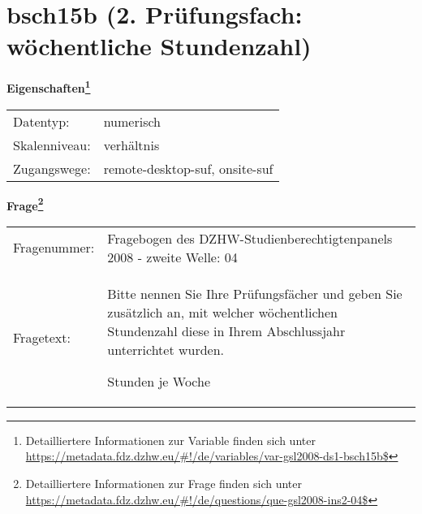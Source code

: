 
    \setcounter{footnote}{0}

    \vspace*{-1.8cm}
	\section{bsch15b (2. Prüfungsfach: wöchentliche Stundenzahl)}
	\label{section:bsch15b}



    \vspace*{0.5cm}
    \noindent\textbf{Eigenschaften\footnote{Detailliertere Informationen zur Variable finden sich unter
		\url{https://metadata.fdz.dzhw.eu/\#!/de/variables/var-gsl2008-ds1-bsch15b$}}}\\
	\begin{tabularx}{\hsize}{@{}lX}
	Datentyp: & numerisch \\
	Skalenniveau: & verhältnis \\
	Zugangswege: &
	  remote-desktop-suf, 
	  onsite-suf
 \\
    \end{tabularx}



				\vspace*{0.5cm}
                \noindent\textbf{Frage\footnote{Detailliertere Informationen zur Frage finden sich unter
		              \url{https://metadata.fdz.dzhw.eu/\#!/de/questions/que-gsl2008-ins2-04$}}}\\
				\begin{tabularx}{\hsize}{@{}lX}
					Fragenummer: &
					  Fragebogen des DZHW-Studienberechtigtenpanels 2008 - zweite Welle:
					  04
 \\
					Fragetext: & Bitte nennen Sie Ihre Prüfungsfächer und geben Sie zusätzlich an, mit welcher wöchentlichen Stundenzahl diese in Ihrem Abschlussjahr unterrichtet wurden.\par  Stunden je Woche \\
				\end{tabularx}





